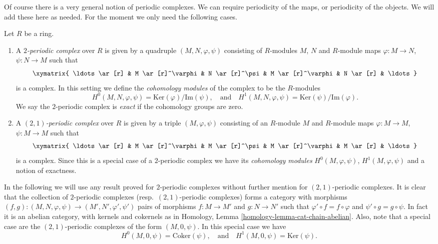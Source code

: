\noindent
Of course there is a very general notion of periodic complexes.
We can require periodicity of the maps, or periodicity of the objects.
We will add these here as needed. For the moment we only need
the following cases.

\begin{definition}
\label{definition-periodic-complex}
Let $R$ be a ring.
\begin{enumerate}
\item A {\it $2$-periodic complex} over $R$ is given
by a quadruple $(M, N, \varphi, \psi)$ consisting of
$R$-modules $M$, $N$ and $R$-module maps $\varphi : M \to N$,
$\psi: N \to M$ such that
$$
\xymatrix{
\ldots \ar[r] &
M \ar[r]^\varphi &
N \ar[r]^\psi &
M \ar[r]^\varphi &
N \ar[r] & \ldots
}
$$
is a complex. In this setting we define the {\it cohomology modules}
of the complex to be the $R$-modules
$$
H^0(M, N, \varphi, \psi) = \text{Ker}(\varphi)/\text{Im}(\psi)
, \quad\text{and}\quad
H^1(M, N, \varphi, \psi) = \text{Ker}(\psi)/\text{Im}(\varphi).
$$
We say the $2$-periodic complex is {\it exact} if the cohomology
groups are zero.
\item A {\it $(2, 1)$-periodic complex} over $R$ is given
by a triple $(M, \varphi, \psi)$ consisting of an $R$-module $M$ and
$R$-module maps $\varphi : M \to M$, $\psi : M \to M$
such that
$$
\xymatrix{
\ldots \ar[r] &
M \ar[r]^\varphi &
M \ar[r]^\psi &
M \ar[r]^\varphi &
M \ar[r] & \ldots
}
$$
is a complex. Since this is a special case of a $2$-periodic complex
we have its {\it cohomology modules} $H^0(M, \varphi, \psi)$,
$H^1(M, \varphi, \psi)$ and a notion of exactness.
\end{enumerate}
\end{definition}

\noindent
In the following we will use any result proved for $2$-periodic
complexes without further mention for $(2, 1)$-periodic complexes.
It is clear that the collection of $2$-periodic complexes
(resp.\ $(2, 1)$-periodic complexes) forms a category with morphisms
$(f, g) : (M, N, \varphi, \psi) \to (M', N', \varphi', \psi')$
pairs of morphisms $f : M \to M'$ and $g : N \to N'$ such
that $\varphi' \circ f = f \circ \varphi$ and $\psi' \circ g = g \circ \psi$.
In fact it is an abelian category, with kernels and cokernels as in
Homology, Lemma \ref{homology-lemma-cat-chain-abelian}.
Also, note that a special case are the
$(2, 1)$-periodic complexes of the form $(M, 0, \psi)$. In this
special case we have
$$
H^0(M, 0, \psi) = \text{Coker}(\psi)
, \quad\text{and}\quad
H^1(M, 0, \psi) = \text{Ker}(\psi).
$$

